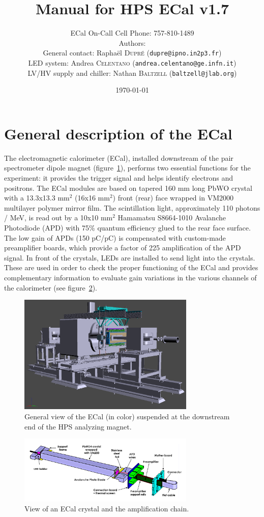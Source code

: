 \documentclass[12pt]{article}
\title{Manual for HPS ECal v1.7}
\author{ECal On-Call Cell Phone: 757-810-1489 \\ 
Authors: \\
General contact: Rapha\"el \textsc{Dupr\'e} (\texttt{dupre@ipno.in2p3.fr})\\ 
LED system: Andrea \textsc{Celentano} (\texttt{andrea.celentano@ge.infn.it})\\
LV/HV supply and chiller: Nathan \textsc{Baltzell} (\texttt{baltzell@jlab.org})\\
}
\date{\today} %
\begin{document}
\maketitle{}

   \section{General description of the ECal}


The electromagnetic calorimeter (ECal), installed downstream of the pair spectrometer dipole magnet (figure~\ref{GView}), performs two essential functions for the experiment: it provides the trigger signal and helps identify electrons and positrons. The ECal modules are based on tapered 160 mm long PbWO crystal with a 13.3x13.3 mm$^2$ (16x16 mm$^2$) front (rear) face wrapped in VM2000 multilayer polymer mirror film. The scintillation light, approximately 110 photons / MeV, is read out by a 10x10 mm$^2$ Hamamatsu S8664-1010 Avalanche Photodiode (APD) with 75\% quantum efficiency glued to the rear face surface. The low gain of APDs (150 pC/pC) is compensated with custom-made preamplifier boards, which provide a factor of 225 amplification of the APD signal. In front of the crystals, LEDs are installed to send light into the crystals. These are used in order to check the proper functioning of the ECal and provides complementary information to evaluate gain variations in the various channels of the calorimeter (see figure~\ref{AmplChain}).

\begin{figure}[hp]
\center
\includegraphics[width=0.75\textwidth]{pics/GView.png}
\caption{\small \label{GView} General view of the ECal (in color) suspended at the downstream end of the HPS analyzing magnet.}
\end{figure}

\begin{figure}[hp]
\center
\includegraphics[width=0.75\textwidth]{pics/CrystalAssembly.png}
\caption{\small \label{AmplChain} View of an ECal crystal and the amplification chain.}
\end{figure}
      
\end{document}
